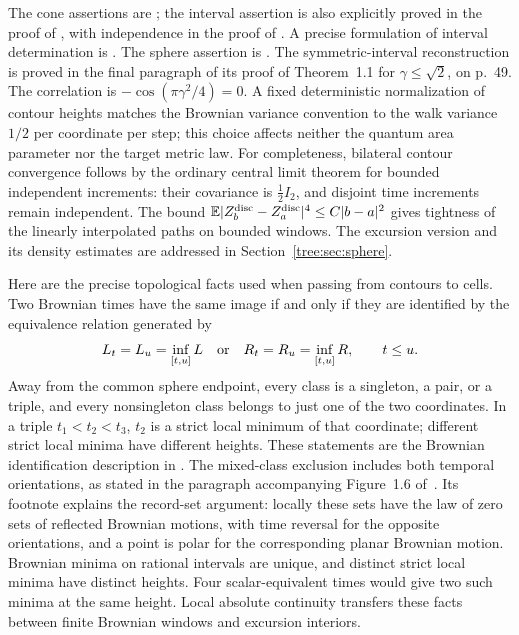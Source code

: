 The cone assertions are \cite[Theorems~1.9 and~1.11]{DMS}; the
interval assertion is also explicitly proved in the proof of
\cite[Corollary~9.3]{DMS}, with independence in the proof of
\cite[Lemma~8.2]{DMS}. A precise formulation of interval
determination is \cite[Lemma~4.9]{GHSSurvey}. The sphere assertion
is \cite[Theorems~1.1 and~3.1]{MillerSheffieldSphere}. The symmetric-interval
reconstruction is proved in the final paragraph of its proof of
Theorem~1.1 for $\gamma\leq\sqrt2$, on p.~49. The correlation is
$-\cos(\pi\gamma^2/4)=0$. A fixed deterministic normalization of
contour heights matches the Brownian variance convention to the
walk variance $1/2$ per coordinate per step; this choice affects
neither the quantum area parameter nor the target metric law.
For completeness, bilateral contour convergence follows by
the ordinary central limit theorem for bounded independent
increments: their covariance is $\tfrac12 I_2$, and disjoint
time increments remain independent. The bound
$\mathbb E|Z^{\mathrm{disc}}_b-Z^{\mathrm{disc}}_a|^4\leq C|b-a|^2$
gives tightness of the linearly interpolated paths on bounded
windows. The excursion version and
its density estimates are addressed in Section~\ref{tree:sec:sphere}.

Here are the precise topological facts used when passing from
contours to cells. Two Brownian times have the same image if and
only if they are identified by the equivalence relation
generated by
\begin{equation}\label{tree:eq:Brownian_identification}
 L_t=L_u=\inf_{[t,u]}L
 \quad\hbox{or}\quad
 R_t=R_u=\inf_{[t,u]}R,\qquad t\leq u.
\end{equation}
Away from the common sphere endpoint, every class is a singleton,
a pair, or a triple, and every nonsingleton class belongs to just
one of the two coordinates. In a triple $t_1<t_2<t_3$, $t_2$
is a strict local minimum of that coordinate; different strict
local minima have different heights. These statements are the
Brownian identification description in
\cite[Section~1.3.1, Figure~1.6 and footnote~2,
Proposition~1.6, Lemma~8.15]{DMS}.
The mixed-class exclusion includes both temporal orientations, as
stated in the paragraph accompanying Figure~1.6 of~\cite{DMS}.
Its footnote explains the record-set argument: locally these sets
have the law of zero sets of reflected Brownian motions, with time
reversal for the opposite orientations, and a point is polar for
the corresponding planar Brownian motion. Brownian minima on rational
intervals are unique, and distinct strict local minima have distinct
heights. Four scalar-equivalent times would give two such minima at
the same height. Local absolute continuity transfers these facts
between finite Brownian windows and excursion interiors.

